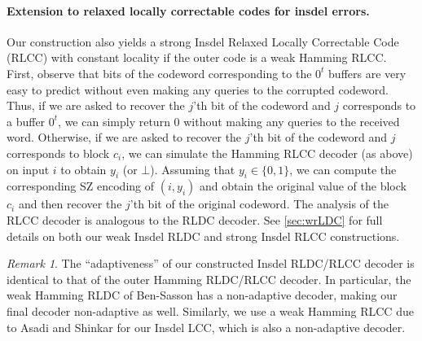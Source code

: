 \documentclass[10pt,a4paper]{article}
\theoremstyle{remark}
\newtheorem{remark}{Remark}
\newcommand{\etal}{\text{et al.}\xspace}
\newcommand{\authnote}[3]{\textcolor{#2}{{\sf (#1's Note: {\sl{#3}})}}}
\newcommand{\xnote}{\authnote{Xin}{magenta}}
\newcommand{\enote}{\authnote{Elena}{green}}
\newcommand{\alex}[1]{\authnote{Alex}{orange}{#1}}
\newcommand{\authnote}{}
\newcommand{\xnote}[1]{}
\newcommand{\enote}[1]{}
\newcommand{\alex}[1]{}
\begin{document}

\paragraph{Extension to relaxed locally correctable codes for insdel errors.}
Our construction also yields a strong Insdel Relaxed Locally Correctable Code (RLCC) with constant locality if the outer code is a weak Hamming RLCC. 
First, observe that bits of the codeword corresponding to the $0^t$ buffers are very easy to predict without even making any queries to the corrupted codeword. 
Thus, if we are asked to recover the $j$'th bit of the codeword and $j$ corresponds to a buffer $0^t$, we can simply return $0$ without making any queries to the received word. 
Otherwise, if we are asked to recover the $j$'th bit of the codeword and $j$ corresponds to block $c_i$, we can simulate the Hamming RLCC decoder (as above) on input $i$ to obtain $y_i$ (or $\bot$). 
Assuming that $y_i \in \{0,1\}$, we can compute the corresponding SZ encoding of $(i,y_i)$ and obtain the original value of the block $c_i$ and then recover the $j$'th bit of the original codeword.
The analysis of the RLCC decoder is analogous to the RLDC decoder.
See \cref{sec:wrLDC} for full details on both our weak Insdel RLDC and strong Insdel RLCC constructions.
\begin{remark}
    The ``adaptiveness'' of our constructed Insdel RLDC/RLCC decoder is identical to that of the outer Hamming RLDC/RLCC decoder.
    In particular, the weak Hamming RLDC of Ben-Sasson \etal \cite{Ben-SassonGHSV06} has a non-adaptive decoder, making our final decoder non-adaptive as well.
    Similarly, we use a weak Hamming RLCC due to Asadi and Shinkar \cite{AsadiS21} for our Insdel LCC, which is also a non-adaptive decoder.
\end{remark}

\end{document}
